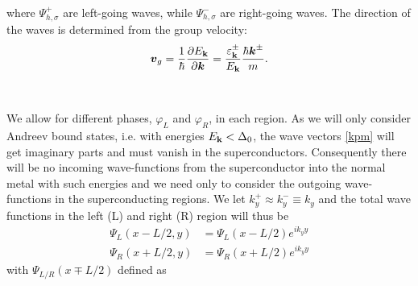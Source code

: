 where $\Psi^+_{h,\sigma}$ are left-going waves, while $\Psi^-_{h,\sigma}$ are right-going waves. The direction of the waves is determined from the group velocity:
\begin{equation}
    \boldsymbol{v}_g = \frac{1}{\hbar}\frac{\partial E_{\mathbf{k}}}{\partial \boldsymbol{k}} = \frac{\varepsilon_{\mathbf{k}}^{\pm}}{E_{\mathbf{k}}}\frac{\hbar\boldsymbol{k}^{\pm}}{m}.
\end{equation}
\\
\\
We allow for different phases, $\varphi_L$ and $\varphi_R$, in each region. As we will only consider Andreev bound states, i.e. with energies $E_{\mathbf{k}}<\Delta_0$, the wave vectors \eqref{kpm} will get imaginary parts and must vanish in the superconductors. Consequently there will be no incoming wave-functions from the superconductor into the normal metal with such energies and we need only to consider the outgoing wave-functions in the superconducting regions. We let $k_y^+ \approx k_y^- \equiv k_y$ and the total wave functions in the left (L) and right (R) region will thus be
\begin{equation}
\begin{split}
    \Psi_L(x-L/2,y) &= \Psi_L(x-L/2)e^{ik_yy}\\
    \Psi_R(x+L/2,y) &= \Psi_R(x+L/2)e^{ik_yy}
\end{split}
\end{equation}
with $\Psi_{L/R}(x\mp L/2)$ defined as 
